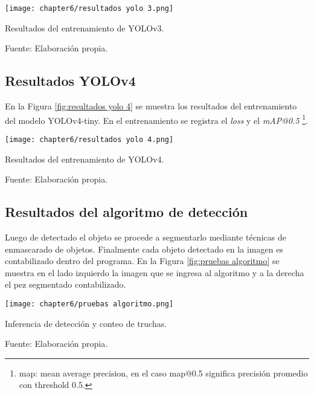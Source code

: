 \begin{myfigure}[H]
	\footnotesize\centering
	\texttt{[image: chapter6/resultados yolo 3.png]}
	\caption{Resultados del entrenamiento de YOLOv3.}
	\begin{myflushcenter}
		Fuente: Elaboración propia.
	\end{myflushcenter}
	\label{fig:resultados yolo 3}
\end{myfigure}

\subsection{Resultados YOLOv4}

En la Figura \ref{fig:resultados yolo 4} se muestra los resultados del entrenamiento del modelo YOLOv4-tiny. En el entrenamiento se registra el \textit{loss} y el \textit{mAP@0.5} \footnote{map: mean average precision, en el caso map@0.5 significa precisión promedio con threshold 0.5.}. 

\begin{myfigure}[H]
	\footnotesize\centering
	\texttt{[image: chapter6/resultados yolo 4.png]}
	\caption{Resultados del entrenamiento de YOLOv4.}
	\begin{myflushcenter}
		Fuente: Elaboración propia.
	\end{myflushcenter}
	\label{fig:resultados yolo 4}
\end{myfigure}


\subsection{Resultados del algoritmo de detección}

Luego de detectado el objeto se procede a segmentarlo mediante técnicas de enmascarado de objetos. Finalmente cada objeto detectado en la imagen es contabilizado dentro del programa. En la Figura \ref{fig:pruebas algoritmo} se muestra en el lado izquierdo la imagen que se ingresa al algoritmo y a la derecha el pez segmentado contabilizado.

\begin{myfigure}[H]
	\footnotesize\centering
	\texttt{[image: chapter6/pruebas algoritmo.png]}
	\caption{Inferencia de detección y conteo de truchas.}
	\begin{myflushcenter}
		Fuente: Elaboración propia.
	\end{myflushcenter}
	\label{fig:pruebas algoritmo}
\end{myfigure}

